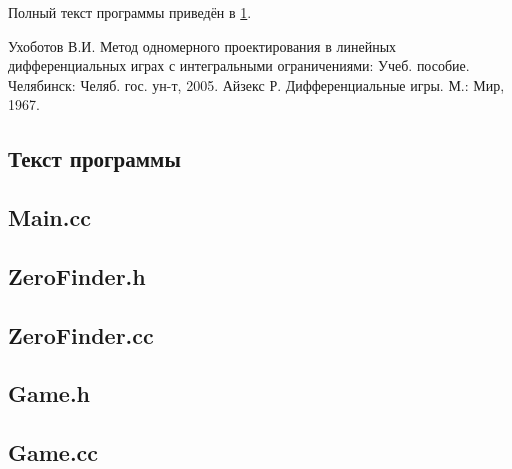 \documentclass[12pt,a4paper,titlepage]{article}
\begin{document}
  Полный текст программы приведён в \ref{appendix:code}.


\begin{thebibliography}{9}
     Ухоботов В.И.
      Метод одномерного проектирования в линейных дифференциальных играх с интегральными ограничениями: 
      Учеб. пособие. Челябинск: Челяб. гос. ун-т, 2005.
     Айзекс Р. Дифференциальные игры. М.: Мир, 1967.
\end{thebibliography}

    \clearpage
        \begin{appendices}
\section{Текст программы}
  \label{appendix:code}
  \subsection{Main.cc}
  
  \subsection{ZeroFinder.h}
  
  \subsection{ZeroFinder.cc}
  
  \subsection{Game.h}
  
  \subsection{Game.cc}
  


\end{appendices}
\end{document}
